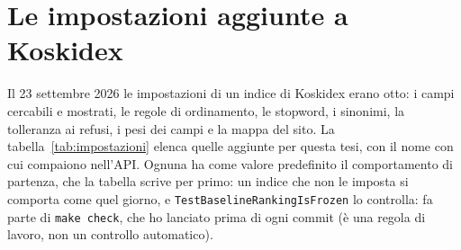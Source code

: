 \chapter{Le impostazioni aggiunte a Koskidex}\label{chapter:appendice-impostazioni}

Il 23 settembre 2026 le impostazioni di un indice di Koskidex erano otto: i campi
cercabili e mostrati, le regole di ordinamento, le stopword, i sinonimi, la
tolleranza ai refusi, i pesi dei campi e la mappa del sito. La
tabella~\ref{tab:impostazioni} elenca quelle aggiunte per questa tesi, con il
nome con cui compaiono nell'API. Ognuna ha come valore predefinito il
comportamento di partenza, che la tabella scrive per primo: un indice che non le
imposta si comporta come quel giorno, e \texttt{TestBaselineRankingIsFrozen} lo
controlla: fa parte di \texttt{make check}, che ho lanciato prima di ogni
commit (è una regola di lavoro, non un controllo automatico).

